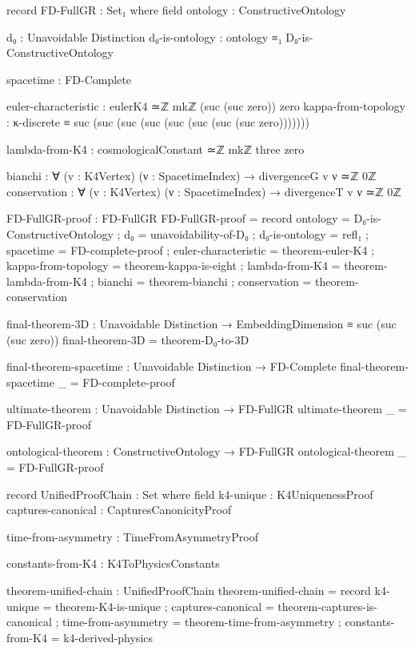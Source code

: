 \documentclass[11pt,a4paper]{book}
\begin{document}
\begin{code}
record FD-FullGR : Set₁ where
  field
    ontology          : ConstructiveOntology
    
    d₀                : Unavoidable Distinction
    d₀-is-ontology    : ontology ≡₁ D₀-is-ConstructiveOntology
    
    spacetime         : FD-Complete
    
    euler-characteristic : eulerK4 ≃ℤ mkℤ (suc (suc zero)) zero
    kappa-from-topology  : κ-discrete ≡ suc (suc (suc (suc (suc (suc (suc (suc zero)))))))
    
    lambda-from-K4    : cosmologicalConstant ≃ℤ mkℤ three zero
    
    bianchi           : ∀ (v : K4Vertex) (ν : SpacetimeIndex) → divergenceG v ν ≃ℤ 0ℤ
    conservation      : ∀ (v : K4Vertex) (ν : SpacetimeIndex) → divergenceT v ν ≃ℤ 0ℤ

FD-FullGR-proof : FD-FullGR
FD-FullGR-proof = record
  { ontology            = D₀-is-ConstructiveOntology
  ; d₀                  = unavoidability-of-D₀
  ; d₀-is-ontology      = refl₁
  ; spacetime           = FD-complete-proof
  ; euler-characteristic = theorem-euler-K4
  ; kappa-from-topology = theorem-kappa-is-eight
  ; lambda-from-K4      = theorem-lambda-from-K4
  ; bianchi             = theorem-bianchi
  ; conservation        = theorem-conservation
  }

final-theorem-3D : Unavoidable Distinction → EmbeddingDimension ≡ suc (suc (suc zero))
final-theorem-3D = theorem-D₀-to-3D

final-theorem-spacetime : Unavoidable Distinction → FD-Complete
final-theorem-spacetime _ = FD-complete-proof

ultimate-theorem : Unavoidable Distinction → FD-FullGR
ultimate-theorem _ = FD-FullGR-proof

ontological-theorem : ConstructiveOntology → FD-FullGR
ontological-theorem _ = FD-FullGR-proof

record UnifiedProofChain : Set where
  field
    k4-unique           : K4UniquenessProof
    captures-canonical  : CapturesCanonicityProof
    
    time-from-asymmetry : TimeFromAsymmetryProof
    
    constants-from-K4   : K4ToPhysicsConstants

theorem-unified-chain : UnifiedProofChain
theorem-unified-chain = record
  { k4-unique          = theorem-K4-is-unique
  ; captures-canonical = theorem-captures-is-canonical
  ; time-from-asymmetry = theorem-time-from-asymmetry
  ; constants-from-K4  = k4-derived-physics
  }
\end{code}
\end{document}
